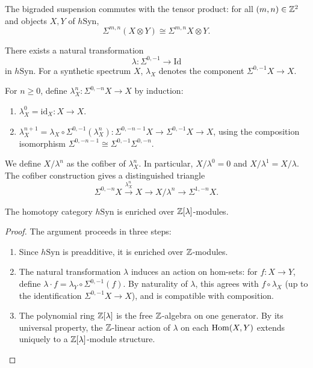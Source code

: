 \begin{axiom}\label{prereq:ax:bishift-tensor-comm}
    The bigraded suspension commutes with the tensor product: for all $(m,n) \in {\mathbb Z}^2$ and objects $X, Y$ of $h\mathrm{Syn}$,
    $$\Sigma^{m,n}(X \otimes Y) \cong \Sigma^{m,n}X \otimes Y.$$
\end{axiom}

\begin{definition}\label{prereq:def:lambda}
    There exists a natural transformation
    $$\lambda: \Sigma^{0,-1} \to \mathrm{Id}$$
    in $h\mathrm{Syn}$. For a synthetic spectrum $X$, $\lambda_X$ denotes the component $\Sigma^{0,-1}X \to X$.
\end{definition}

\begin{definition}\label{prereq:def:lambda-power}
    For $n \ge 0$, define $\lambda^n_X: \Sigma^{0,-n}X \to X$ by induction:
    \begin{enumerate}
        \item $\lambda^0_X = \mathrm{id}_X: X \to X$.
        \item $\lambda^{n+1}_X = \lambda_X \circ \Sigma^{0,-1}(\lambda^n_X): \Sigma^{0,-n-1}X \to \Sigma^{0,-1}X \to X$, using the composition isomorphism $\Sigma^{0,-n-1} \cong \Sigma^{0,-1}\Sigma^{0,-n}$.
    \end{enumerate}
    We define $X/\lambda^n$ as the cofiber of $\lambda^n_X$. In particular, $X/\lambda^0 = 0$ and $X/\lambda^1 = X/\lambda$. The cofiber construction gives a distinguished triangle
    $$\Sigma^{0,-n}X \xrightarrow{\lambda^n_X} X \to X/\lambda^n \to \Sigma^{1,-n}X.$$
\end{definition}

\begin{proposition}\label{prereq:prop:zlambda-enrichment}
    The homotopy category $h\mathrm{Syn}$ is enriched over ${\mathbb Z}[\lambda]$-modules.
\end{proposition}
\begin{proof}
    The argument proceeds in three steps:
    \begin{enumerate}
        \item Since $h\mathrm{Syn}$ is preadditive, it is enriched over ${\mathbb Z}$-modules.
        \item The natural transformation $\lambda$ induces an action on hom-sets: for $f: X \to Y$, define $\lambda \cdot f = \lambda_Y \circ \Sigma^{0,-1}(f)$. By naturality of $\lambda$, this agrees with $f \circ \lambda_X$ (up to the identification $\Sigma^{0,-1}X \to X$), and is compatible with composition.
        \item The polynomial ring ${\mathbb Z}[\lambda]$ is the free ${\mathbb Z}$-algebra on one generator. By its universal property, the ${\mathbb Z}$-linear action of $\lambda$ on each $\mathrm{Hom}(X,Y)$ extends uniquely to a ${\mathbb Z}[\lambda]$-module structure.
    \end{enumerate}
\end{proof}

